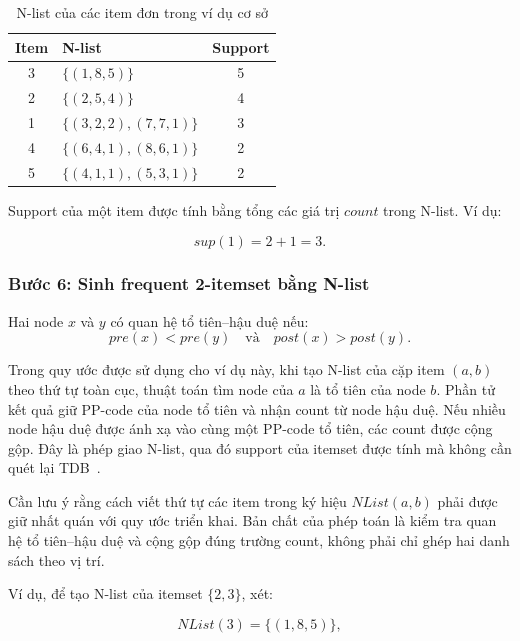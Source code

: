 \begin{table}[H]
\centering
\caption{N-list của các item đơn trong ví dụ cơ sở}
\label{tab:basic-single-nlists}
\begin{tabular}{clc}
\toprule
Item & N-list & Support \\
\midrule
3 & $\{(1,8,5)\}$ & 5 \\
2 & $\{(2,5,4)\}$ & 4 \\
1 & $\{(3,2,2),(7,7,1)\}$ & 3 \\
4 & $\{(6,4,1),(8,6,1)\}$ & 2 \\
5 & $\{(4,1,1),(5,3,1)\}$ & 2 \\
\bottomrule
\end{tabular}
\end{table}

Support của một item được tính bằng tổng các giá trị $count$ trong N-list. Ví dụ:

\begin{equation}
    sup(1)=2+1=3.
    \label{eq:basic-support-item-1}
\end{equation}

\subsubsection{Bước 6: Sinh frequent 2-itemset bằng N-list}

Hai node $x$ và $y$ có quan hệ tổ tiên--hậu duệ nếu:
\begin{equation}
    pre(x)<pre(y)
    \quad\text{và}\quad
    post(x)>post(y).
    \label{eq:basic-ancestor-condition}
\end{equation}

Trong quy ước được sử dụng cho ví dụ này, khi tạo N-list của cặp item
$(a,b)$ theo thứ tự toàn cục, thuật toán tìm node của $a$ là tổ tiên của node
$b$. Phần tử kết quả giữ PP-code của node tổ tiên và nhận count từ node hậu
duệ. Nếu nhiều node hậu duệ được ánh xạ vào cùng một PP-code tổ tiên, các count
được cộng gộp. Đây là phép giao N-list, qua đó support của itemset được tính mà
không cần quét lại TDB~\cite{deng2012prepost}.

Cần lưu ý rằng cách viết thứ tự các item trong ký hiệu $NList(a,b)$ phải được
giữ nhất quán với quy ước triển khai. Bản chất của phép toán là kiểm tra quan hệ
tổ tiên--hậu duệ và cộng gộp đúng trường count, không phải chỉ ghép hai danh
sách theo vị trí.

Ví dụ, để tạo N-list của itemset $\{2,3\}$, xét:

\begin{equation}
    NList(3)=\{(1,8,5)\},
\end{equation}

